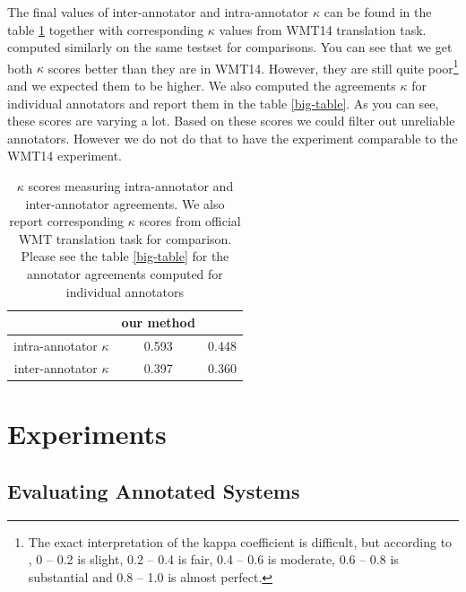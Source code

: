 The final values of inter-annotator and intra-annotator $\kappa$ can be found
in the table \ref{agreements} together with corresponding $\kappa$ values from
WMT14 translation task.   computed similarly on
the same testset for comparisons. You can see that we get both $\kappa$ scores
better than they are in WMT14. However, they are still quite poor\footnote{ The
exact interpretation of the kappa coefficient is difficult, but according
to \cite{landis77}, 0 -- 0.2 is slight, 0.2 -- 0.4 is fair, 0.4 -- 0.6 is
moderate, 0.6 -- 0.8 is substantial and 0.8 -- 1.0 is almost perfect.} and we
expected them to be higher. We also computed the agreements $\kappa$ for
individual annotators and report them in the table \ref{big-table}.  As you can
see, these scores are varying a lot. Based on these scores we could filter out
unreliable annotators. However we do not do that to have the experiment
comparable to the WMT14 experiment.


\begin{table}
    \begin{center}
        \begin{tabular}{r|cc}
                                     & our method & \cite{wmt14-overview-paper} \\
            \hline
            intra-annotator $\kappa$ &  0.593     & 0.448    \\
            inter-annotator $\kappa$ &  0.397     & 0.360     \\
        \end{tabular}
    \end{center}

    \caption[Inter-annotator and intra-annotator $\kappa$ scores]{$\kappa$
        scores measuring intra-annotator and inter-annotator agreements. We
        also report corresponding $\kappa$ scores from official WMT translation
        task for comparison.  Please see the table \ref{big-table} for the
    annotator agreements computed for individual annotators}

    \label{agreements}
\end{table}




\section{Experiments}

\subsection{Evaluating Annotated Systems}
\label{evaluating-annotated-systems}

